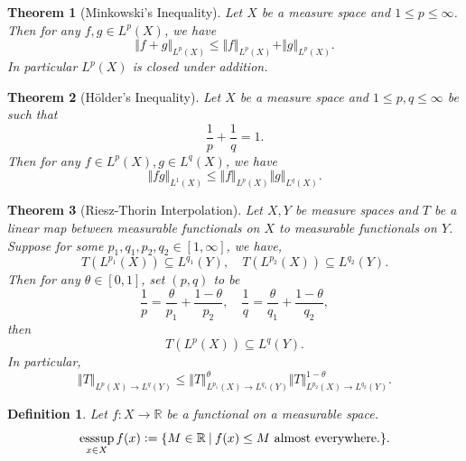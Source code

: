 \documentclass[8pt]{article}
\newtheorem{theorem}{Theorem} [section]
\newtheorem{definition}{Definition}[section]
\DeclareMathOperator{\esssup}{esssup}
\newcommand{\sep}[0]{\:\vert\:}
\newcommand{\defeq}{\vcentcolon=}
\newcommand{\bR}[0]{\mathbb{R}}
\begin{document}
\begin{theorem}[Minkowski's Inequality]
Let $X$ be a measure space and $1\leq p\leq\infty$. Then for any $f,g\in L^p(X)$, we have
\begin{equation*}
\Vert f+g\Vert_{L^p(X)}\leq \Vert f\Vert_{L^p(X)}+\Vert g\Vert_{L^p(X)}.
\end{equation*}
In particular $L^p(X)$ is closed under addition.
\end{theorem}

\begin{theorem}[Hölder's Inequality]
Let $X$ be a measure space and $1\leq p,q\leq\infty$ be such that 
\begin{equation*}
  {\frac 1 p}+{\frac 1 q} = 1.
\end{equation*}
Then for any $f\in L^p(X),g\in L^q(X)$, we have
\begin{equation*}
\Vert fg\Vert_{L^1(X)}\leq \Vert f\Vert_{L^p(X)}\Vert g\Vert_{L^q(X)}.
\end{equation*}
\end{theorem}

\begin{theorem}[Riesz-Thorin Interpolation]
Let $X,Y$ be measure spaces and $T$ be a linear map between measurable functionals on $X$ to measurable functionals on $Y$. Suppose for some $p_1,q_1,p_2,q_2\in[1,\infty]$, we have,
\begin{equation*}
T(L^{p_1}(X))\subseteq L^{q_1}(Y),\quad T(L^{p_2}(X))\subseteq L^{q_2}(Y).
\end{equation*}
Then for any $\theta\in[0,1]$, set $(p,q)$ to be
\begin{equation*}
{\frac 1 p} = {\frac \theta {p_1}}+{\frac {1-\theta} {p_2}},\quad {\frac 1 q} = {\frac \theta {q_1}}+{\frac {1-\theta} {q_2}},
\end{equation*}
then 
\begin{equation*}
T(L^p(X))\subseteq L^q(Y).
\end{equation*}
In particular, 
\begin{equation*}
\Vert T\Vert_{L^p(X)\to L^q(Y)} \leq \Vert T\Vert^\theta_{L^{p_1}(X)\to L^{q_1}(Y)}\Vert T\Vert^{1-\theta}_{L^{p_2}(X)\to L^{q_2}(Y)}.
\end{equation*}
\label{riesz-thorin}
\end{theorem}

\begin{definition}
  Let $f:X\to \bR$ be a functional on a measurable space.
  \begin{equation*}
    \esssup_{x\in X}f(x) \defeq \{M\in\bR\sep f(x)\leq M\text{ almost everywhere.}\}.
  \end{equation*}
\end{definition}
\end{document}
